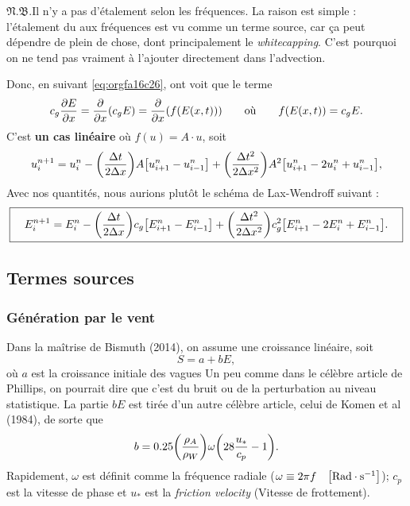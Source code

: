 \documentclass[10pt]{article}
\numberwithin{equation}{section}
\newcommand{\pt}{\hspace{1pt}} %
\newcommand{\nb}{\underline{{\footnotesize\EightStarConvex}\pt $\mathfrak{N.B.}$\vphantom{p}}\hspace{3pt}}
\newcommand{\rad}{\text{Rad}}
\begin{document}
\nb Il n'y a pas d'étalement selon les fréquences.
La raison est simple : l'étalement du aux fréquences est vu comme un terme source, car ça peut dépendre de plein de chose, dont principalement le \emph{whitecapping}.
C'est pourquoi on ne tend pas vraiment à l'ajouter directement dans l'advection.\bigskip

Donc, en suivant \ref{eq:orgfa16c26}, ont voit que le terme
\begin{equation}
   c_g \pdv{E}{x} = \pdv{}{x} \qty(c_g E) = \pdv{}{x} \qty(f(E(x,t))) \quad\quad \text{où} \quad\quad f\qty(E(x,t)) = c_g E.
\end{equation}
C'est \textbf{un cas linéaire} où \(f(u) = A\cdot u\), soit
\begin{equation}
   u_i^{n+1} = u_i^n - \qty(\frac{\Delta t}{2\Delta x}) A \qty[u^n_{i+1} - u^n_{i-1}] + \qty(\frac{\Delta t^2}{2 \Delta x^2})A^2 \qty[u^n_{i+1} -2u^n_{i} + u^n_{i-1}],
\end{equation}
Avec nos quantités, nous aurions plutôt le schéma de Lax-Wendroff suivant : 
\begin{equation}
   \boxed{\quad E_i^{n+1} = E_i^n - \qty(\frac{\Delta t}{2\Delta x}) c_g \qty[E^n_{i+1} - E^n_{i-1}] + \qty(\frac{\Delta t^2}{2 \Delta x^2})c_g^2 \qty[E^n_{i+1} -2E^n_{i} + E^n_{i-1}].\quad}
\end{equation}
\subsection{Termes sources}
\label{sec:orgab02a21}

\subsubsection{Génération par le vent}
\label{sec:orga975db3}

Dans la maîtrise de Bismuth (2014), on assume une croissance linéaire, soit
\begin{equation}
   S = a + bE,
\end{equation}
où \(a\) est la croissance initiale des vagues
Un peu comme dans le célèbre article de Phillips, on pourrait dire que c'est du bruit ou de la perturbation au niveau statistique.
La partie \(bE\) est tirée d'un autre célèbre article, celui de Komen et al (1984), de sorte que
\begin{equation}
   b = 0.25\qty(\frac{\rho_A}{\rho_W})\omega\qty(28\frac{u_*}{c_p} - 1).
\end{equation}
Rapidement, \(\omega\) est définit comme la fréquence radiale (\(\omega \equiv 2\pi f\quad\qty[\rad\cdot\mathrm{s}^{-1}]\)); \(c_p\) est la vitesse de phase et \(u_*\) est la \emph{friction velocity} (Vitesse de frottement).\bigskip
\end{document}
